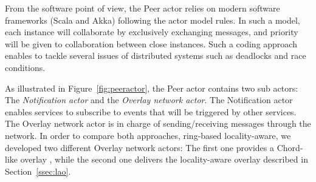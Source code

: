 From the software point of view, the Peer actor relies on modern software frameworks (Scala
and Akka) following the actor model rules. In such a model, each instance will
collaborate by exclusively exchanging messages, and priority will be given to collaboration
between close instances. Such a coding approach enables to tackle several issues of
distributed systems such as deadlocks and race conditions.

%

As illustrated in Figure~\ref{fig:peeractor}, the Peer actor contains two sub actors: The
\emph{Notification actor} and the \emph{Overlay network actor}. The Notification actor
enables services to subscribe to events that will be triggered by other services. The
Overlay network actor is in charge of sending/receiving messages through the network. In order
to compare both approaches, ring-based \vs locality-aware, we developed two different
Overlay network actors: The first one provides a Chord-like overlay
\cite{stoica2001chord}, while the second one delivers the locality-aware overlay described
in Section~\ref{ssec:lao}.

